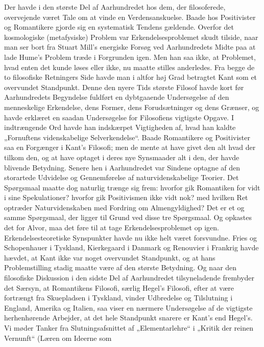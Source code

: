 \documentclass[12pt,a4paper,openany]{book}
\newcommand{\opage}[1]{\marginnote{\footnotesize\textit{[#1]}}}
\begin{document}
Der havde i den største Del af Aarhundredet hos dem, der filosoferede,
overvejende været Tale om at vinde en Verdensanskuelse.
Baade hos Positivister og Romantikere gjorde sig en systematisk
Tendens gældende. Overfor det kosmologiske (metafysiske) Problem
var Erkendelsesproblemet skudt tilside, naar man ser bort fra
Stuart Mill’s energiske Forsøg ved Aarhundredets Midte paa at lade
Hume’s Problem træde i Forgrunden igen. Men han saa ikke, at Problemet,
hvad enten det kunde løses eller ikke, nu maatte stilles anderledes.
Fra begge de to filosofiske Retningers Side havde man i
altfor høj Grad betragtet Kant som et overvundet Standpunkt. Denne
den nyere Tids største Filosof havde kort før Aarhundredets Begyndelse
fuldført en dybtgaaende Undersøgelse af den menneskelige
Erkendelse, dens Former, dens Forudsætninger og dens Grænser, og
havde erklæret en saadan Undersøgelse for Filosofiens vigtigste Opgave.
I indtrængende Ord havde han indskærpet Vigtigheden af,
hvad han kaldte „Fornuftens videnskabelige Selverkendelse“. Baade
Romantikere og Positivister saa en Forgænger i Kant’s Filosofi; men
de mente at have givet den alt hvad der tilkom den, og at have optaget
i deres nye Synsmaader alt i den, der havde blivende Betydning.
Senere hen i Aarhundredet var Sindene optagne af den storartede
Udvidelse og Gennemførelse af naturvidenskabelige Teorier.
\opage{78}Det Spørgsmaal maatte dog naturlig trænge sig frem: hvorfor gik
Romantiken for vidt i sine Spekulationer? hvorfor gik Positivismen
ikke vidt nok? med hvilken Ret optræder Naturvidenskaben med
Fordring om Almengyldighed? Det er et og samme Spørgsmaal, der
ligger til Grund ved disse tre Spørgsmaal. Og opkastes det for Alvor,
maa det føre til at tage Erkendelsesproblemet op igen. Erkendelsesteoretiske
Synspunkter havde nu ikke helt været forsvundne. Fries
og Schopenhauer i Tyskland, Kierkegaard i Danmark og Renouvier
i Frankrig havde hævdet, at Kant ikke var noget overvundet Standpunkt,
og at hans Problemstilling stadig maatte være af den største
Betydning. Og naar den filosofiske Diskussion i den sidste Del af
Aarhundredet tilsyneladende frembyder det Særsyn, at Romantikens
Filosofi, særlig Hegel’s Filosofi, efter at være fortrængt fra Skuepladsen
i Tyskland, vinder Udbredelse og Tilslutning i England,
Amerika og Italien, saa viser en nærmere Undersøgelse af de vigtigste
herhenhørende Arbejder, at det hele Standpunkt snarere er
Kant’s end Hegel’s. Vi møder Tanker fra Slutningsafsnittet af „Elementarlehre“
i „Kritik der reinen Vernunft“ (Læren om Ideerne som
\end{document}
